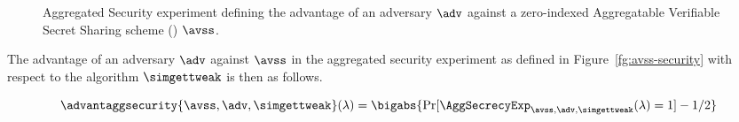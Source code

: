 \begin{figure}[!ht]
  \caption{Aggregated Security experiment defining the advantage of an adversary $\adv$ against a zero-indexed Aggregatable Verifiable Secret Sharing scheme (\AVSS) $\avss$.
}
  \label{fg:avss-security1}
\end{figure}


The advantage of an adversary $\adv$ against $\avss$ in the aggregated security experiment as defined in Figure~\ref{fg:avss-security} with respect to the algorithm $\simgettweak$ is then as follows.

\[
  \advantaggsecurity{\avss, \adv, \simgettweak}(\lambda) = \bigabs{\Pr[\AggSecrecyExp_{\avss, \adv,\simgettweak}(\lambda) = 1 ] - 1/2 }
\]

